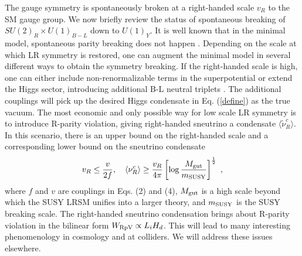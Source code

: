 \documentclass[prd,aps,preprint,tightenlines,superscriptaddress]{revtex4}
\begin{document}
The gauge symmetry is spontaneously broken at a right-handed scale $v_R$ to the SM gauge group.
We now briefly review the status of spontaneous breaking of $SU(2)_R \times U(1)_{B-L}$ down to $U(1)_Y$. It is well known that in the minimal model, spontaneous parity breaking does not
happen \cite{susylr2}. Depending on the scale at which LR symmetry is restored, one can augment the minimal model in several
different ways to obtain the symmetry breaking. If the right-handed scale is high, one can either include non-renormalizable terms in the superpotential or extend the Higgs sector, introducing additional B-L neutral triplets \cite{Aulakh:1997ba}. The additional couplings will pick up the desired Higgs condensate in Eq. (\ref{define}) as the true vacuum. The most economic and only possible way for
low scale LR symmetry is to introduce R-parity violation, giving right-handed sneutrino a condensate $\langle \widetilde \nu_R^c \rangle$. In this scenario, there is an upper bound on the right-handed scale and a corresponding lower bound on the sneutrino condensate \cite{susylr2, RpVpaper}
\begin{eqnarray}
v_R \leq \frac{v}{2f}, \ \ \ \langle \nu^c_R \rangle \geq \frac{v_R}{4 \pi} \left[ \log \frac{M_{\rm gut}}{m_{\rm SUSY}} \right]^{\frac{1}{2}} \ ,
\end{eqnarray}
where $f$ and $v$ are couplings in Eqs. (2) and (4), $M_{\rm gut}$ is a high scale beyond which the SUSY LRSM unifies into a larger theory,
and $m_{\rm SUSY}$ is the SUSY breaking scale.
The right-handed sneutrino condensation brings about R-parity violation in the bilinear form $W_{\rm RpV} \propto L_i H_d$. This will lead to many interesting phenomenology in cosmology and at colliders. We will address these issues elsewhere.
\end{document}
